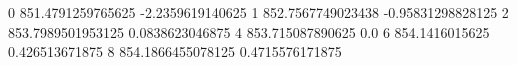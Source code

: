 0 851.4791259765625 -2.2359619140625
1 852.7567749023438 -0.95831298828125
2 853.7989501953125 0.0838623046875
4 853.715087890625 0.0
6 854.1416015625 0.426513671875
8 854.1866455078125 0.4715576171875
